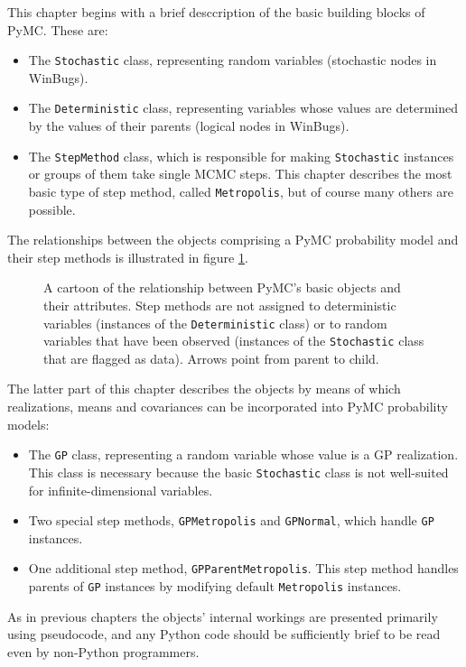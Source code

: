 \documentclass{report}
\begin{document}
This chapter begins with a brief desccription of the basic building blocks of PyMC. These are:
\begin{itemize}
    \item The \texttt{Stochastic} class, representing random variables (stochastic nodes in WinBugs).
    \item The \texttt{Deterministic} class, representing variables whose values are determined by the values of their parents (logical nodes in WinBugs).
    \item The \texttt{StepMethod} class, which is responsible for making \texttt{Stochastic} instances or groups of them take single MCMC steps. This chapter describes the most basic type of step method, called \texttt{Metropolis}, but of course many others are possible.
\end{itemize}
The relationships between the objects comprising a PyMC probability model and their step methods is illustrated in figure \ref{fig:pymccartoon}.
\begin{figure}
    \centering
    \caption{A cartoon of the relationship between PyMC's basic objects and their attributes. Step methods are not assigned to deterministic variables (instances of the \texttt{Deterministic} class) or to random variables that have been observed (instances of the \texttt{Stochastic} class that are flagged as data). Arrows point from parent to child.}
    \label{fig:pymccartoon}
\end{figure}

The latter part of this chapter describes the objects by means of which realizations, means and covariances can be incorporated into PyMC probability models:
\begin{itemize}
    \item The \texttt{GP} class, representing a random variable whose value is a GP realization. This class is necessary because the basic \texttt{Stochastic} class is not well-suited for infinite-dimensional variables.
    \item Two special step methods, \texttt{GPMetropolis} and \texttt{GPNormal}, which handle \texttt{GP} instances.
    \item One additional step method, \texttt{GPParentMetropolis}. This step method handles parents of \texttt{GP} instances by modifying default \texttt{Metropolis} instances.
\end{itemize}

As in previous chapters the objects' internal workings are presented primarily using pseudocode, and any Python code should be sufficiently brief to be read even by non-Python programmers.
\end{document}
